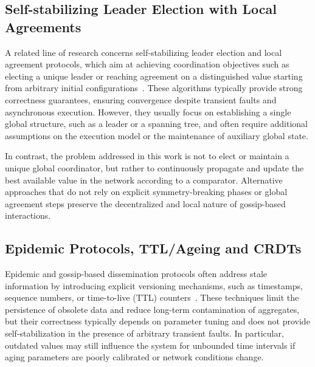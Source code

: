 \documentclass[runningheads]{llncs}
\begin{document}
\subsection{Self-stabilizing Leader Election with Local Agreements}\label{subsec:self-stabilizing-leader-election-with-local-agreements}
A related line of research concerns self-stabilizing leader election and local agreement protocols,
which aim at achieving coordination objectives such as electing a unique leader or reaching agreement on a distinguished value starting from arbitrary initial configurations~\cite{DBLP:books/mit/Dolev2000}.
%
These algorithms typically provide strong correctness guarantees,
ensuring convergence despite transient faults and asynchronous execution.
%
However,
they usually focus on establishing a single global structure,
such as a leader or a spanning tree,
and often require additional assumptions on the execution model or the maintenance of auxiliary global state.

In contrast,
the problem addressed in this work is not to elect or maintain a unique global coordinator,
but rather to continuously propagate and update the best available value in the network according to a comparator.
%
Alternative approaches that do not rely on explicit symmetry-breaking phases
or global agreement steps
preserve the decentralized and local nature of gossip-based interactions.

%
%
\subsection{Epidemic Protocols, TTL/Ageing and CRDTs}\label{subsec:epidemic-protocols-ttl/ageing-and-crdts2}
Epidemic and gossip-based dissemination protocols often address stale information by introducing explicit versioning mechanisms,
such as timestamps, sequence numbers, or time-to-live (TTL) counters~\cite{DBLP:conf/podc/DemersGHIL87}.
%
These techniques limit the persistence of obsolete data and reduce long-term contamination of aggregates,
but their correctness typically depends on parameter tuning and does not provide self-stabilization in the presence of arbitrary transient faults.
%
In particular,
outdated values may still influence the system for unbounded time intervals if aging parameters are poorly calibrated or network conditions change.
\end{document}

